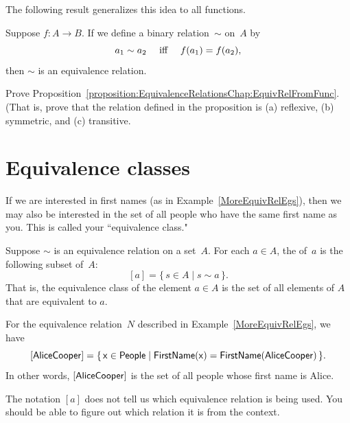 The following result generalizes this idea to all functions.

\begin{prop}\label{proposition:EquivalenceRelationsChap:EquivRelFromFunc}
Suppose $f \colon A \to B$. If we define a binary relation~$\sim$ on~$A$ by
	$$ \text{$a_1 \sim a_2$ \quad iff \quad $f(a_1) = f(a_2)$} ,$$
then $\sim$ is an equivalence relation.
\end{prop}

\begin{exercise}\label{exercise:EquivalenceRelationsChap:EquivRelFromFuncPfEx}
Prove Proposition~\ref{proposition:EquivalenceRelationsChap:EquivRelFromFunc}. (That is, prove that the relation defined in the proposition is (a) reflexive, (b) symmetric, and (c) transitive.
\end{exercise}



 \section{Equivalence classes} \label{EquivalenceRelationsClassesSect}

If we are interested in first names (as in Example~\ref{MoreEquivRelEgs}), then we may also be interested in the set of all people who have the same first name as you. This is called your ``equivalence class."
 
 \begin{defn}\label{DefEquivRel}
 Suppose $\sim$ is an equivalence relation on a set~$A$. For each $a \in A$, the  of~$a$ is the following subset of~$A$:
 	$$ [a] = \{\, s \in A \mid s \sim a \,\} .$$
That is, the equivalence class of the element $a \in A$ is the set of all elements of $A$ that are equivalent to $a$.
\end{defn}


\begin{eg}
For the equivalence relation~$N$ described in Example~\ref{MoreEquivRelEgs}, we have
	$$ [\sf{Alice Cooper}] = \{\, x \in \sf{People} \mid \sf{FirstName}(x) = \sf{FirstName}(\sf{Alice Cooper}) \,\} .$$
In other words, $[\sf{Alice Cooper}]$ is the set of all people whose first name is Alice.
\end{eg}


\begin{warn}
The notation $[a]$ does not tell us which equivalence relation is being used. You should be able to figure out which relation it is from the context.
\end{warn}


